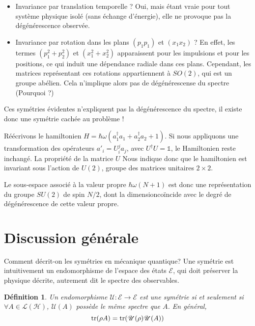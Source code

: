 \documentclass[11pt,twoside,a4paper]{report}
\numberwithin{equation}{part}
\newtheorem{definition}[theorem]{Définition}
\begin{document}
\begin{itemize}
    \item Invariance par translation temporelle ? Oui, mais étant vraie pour tout système physique isolé (sans échange d'énergie), elle ne provoque pas la dégénérescence observée.
    \item Invariance par rotation dans les plans $(p_1p_1)$ et $(x_1x_2)$ ? En effet, les termes $(p_1^2 + p_2^2)$ et $(x_1^2 + x_2^2)$ apparaissent pour les impulsions et pour les positions, ce qui induit une dépendance radiale dans ces plans. Cependant, les matrices représentant ces rotations appartiennent à $SO(2)$, qui est un groupe abélien. Cela n'implique alors pas de dégénérescense du spectre (Pourquoi ?)
\end{itemize}

Ces symétries évidentes n'expliquent pas la dégénérescence du spectre, il existe donc une symétrie cachée au problème !


Réécrivons le hamiltonien $H = \hbar\omega(a_1^\dagger a_1 + a_2^\dagger a_2 + 1)$. Si nous appliquons une transformation des opérateurs $a'_i = U_i^j a_j$, avec $U^\dagger U = \mathds{1}$, le Hamiltonien reste inchangé. La propriété de la matrice $U$ Nous indique donc que le hamiltonien est invariant sous l'action de $U(2)$, groupe des matrices unitaires $2\times 2$.

Le sous-espace associé à la valeur propre $\hbar\omega(N+1)$ est donc une représentation du groupe $SU(2)$ de spin $N/2$, dont la dimension\footnotemark coïncide avec le degré de dégénérescence de cette valeur propre.


\section{Discussion générale}

Comment décrit-on les symétries en mécanique quantique? Une symétrie est intuitivement un endomorphisme de l'espace des états $\mathcal{E}$, qui doit préserver la physique décrite, autrement dit le spectre des observables.

\begin{definition}
Un endomorphisme $\mathcal{U}:\mathcal{E} \to \mathcal{E}$ est une \emph{symétrie} si et seulement si $\forall A \in \mathcal{L}(\mathcal{H})$, $\mathcal{U}(A)$ possède le même spectre que $A$. En général,
$$ \tr(\rho A) = \tr(\mathcal{U}(\rho)\mathcal{U}(A)) $$
\end{definition}
\end{document}
